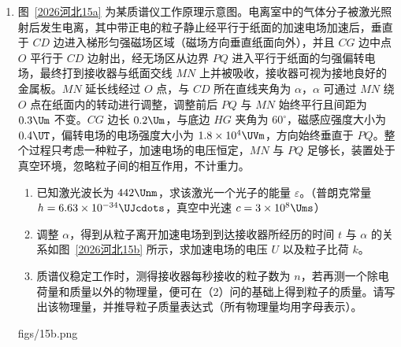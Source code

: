 \documentclass[\gkver]{gaokaozhenti}
\begin{document}
\begin{enumerate}
{\begin{enumerate}
\item
$0.48\UJ$
\end{enumerate}
}


\item
图~\ref{2026河北15a} 为某质谱仪工作原理示意图。电离室中的气体分子被激光照射后发生电离，其中带正电的粒子静止经平行于纸面的加速电场加速后，垂直于 $CD$ 边进入梯形匀强磁场区域（磁场方向垂直纸面向外），并且 $CG$ 边中点 $O$ 平行于 $CD$ 边射出，经无场区从边界 $PQ$ 进入平行于纸面的匀强偏转电场，最终打到接收器与纸面交线 $MN$ 上并被吸收，接收器可视为接地良好的金属板。$MN$ 延长线经过 $O$ 点，与 $CD$ 所在直线夹角为 $\alpha$，$\alpha$ 可通过 $MN$ 绕 $O$ 点在纸面内的转动进行调整，调整前后 $PQ$ 与 $MN$ 始终平行且间距为 $0.3\Um$ 不变。$CG$ 边长 $0.2\Um$，与底边 $HG$ 夹角为 $60^\circ$，磁感应强度大小为 $0.4\UT$，偏转电场的电场强度大小为 $1.8\times10^{4}\UVm$，方向始终垂直于 $PQ$。整个过程只考虑一种粒子，加速电场的电压恒定，$MN$ 与 $PQ$ 足够长，装置处于真空环境，忽略粒子间的相互作用，不计重力。
\begin{enumerate}
\item
已知激光波长为 $442\Unm$，求该激光一个光子的能量 $\varepsilon$。（普朗克常量 $h = 6.63\times10^{-34}\UJcdots$，真空中光速 $c = 3\times10^{8}\Ums$）
\item
调整 $\alpha$，得到从粒子离开加速电场到到达接收器所经历的时间 $t$ 与 $\alpha$ 的关系如图~\ref{2026河北15b} 所示，求加速电场的电压 $U$ 以及粒子比荷 $k$。
\item
质谱仪稳定工作时，测得接收器每秒接收的粒子数为 $n$，若再测一个除电荷量和质量以外的物理量，便可在（2）问的基础上得到粒子的质量。请写出该物理量，并推导粒子质量表达式（所有物理量均用字母表示）。
\end{enumerate}
{figs/15b.png}


\end{enumerate}
\end{document}
